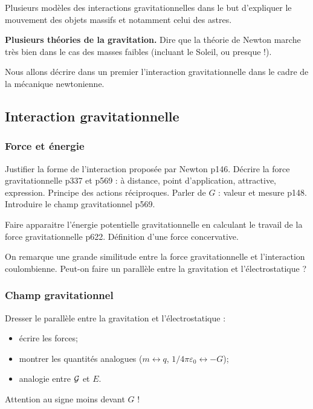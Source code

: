 Plusieurs modèles des interactions gravitationnelles dans le but d'expliquer le mouvement des objets massifs et notamment celui des astres.
\begin{slide}
\textbf{Plusieurs théories de la gravitation.}
Dire que la théorie de Newton marche très bien dans le cas des masses faibles (incluant le Soleil, ou presque !).
\end{slide}

\begin{transition}
Nous allons décrire dans un premier l'interaction gravitationnelle dans le cadre de la mécanique newtonienne.
\end{transition}

\subsection{Interaction gravitationnelle}

\subsubsection{Force et énergie}

Justifier la forme de l'interaction proposée par Newton \cite{Faroux1996} p146.
Décrire la force gravitationnelle \cite{Michel2017} p337 et \cite{Salamito2016} p569 : à distance, point d'application, attractive, expression.
Principe des actions réciproques.
Parler de $G$ : valeur et mesure \cite{Faroux1996} p148.
Introduire le champ gravitationnel \cite{Salamito2016} p569.

Faire apparaitre l'énergie potentielle gravitationnelle en calculant le travail de la force gravitationnelle \cite{Salamito2016} p622.
Définition d'une force concervative.

\begin{transition}
On remarque une grande similitude entre la force gravitationnelle et l'interaction coulombienne.
Peut-on faire un parallèle entre la gravitation et l'électrostatique ?
\end{transition}

\subsubsection{Champ gravitationnel}

Dresser le parallèle entre la gravitation et l'électrostatique :
\begin{itemize}
\item écrire les forces;
\item montrer les quantités analogues ($m \leftrightarrow q$, $1/4\pi\varepsilon_0 \leftrightarrow -G$);
\item analogie entre ${\cal{G}}$ et $E$.
\end{itemize}
\begin{remarque}
Attention au signe moins devant $G$ ! 
\end{remarque}


